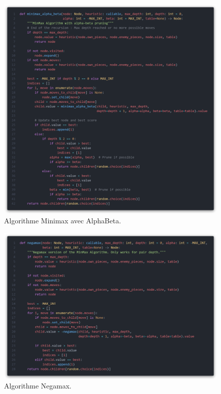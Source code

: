 \begin{figure}[H]
    \centering
    \includegraphics[width=1\textwidth]{ressources/minimax-a-b.png}
    \caption{Algorithme Minimax avec AlphaBeta.}
    \label{fig:minimax-a-b}
\end{figure}

\begin{figure}[H]
    \centering
    \includegraphics[width=1\textwidth]{ressources/negamax.png}
    \caption{Algorithme Negamax.}
    \label{fig:negamax}
\end{figure}


